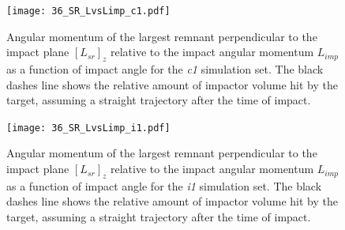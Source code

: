 {\begin{landscape}
\begin{figure}
\begin{center}
\texttt{[image: 36\_SR\_LvsLimp\_c1.pdf]}
\caption{Angular momentum of the largest remnant perpendicular to the impact plane $[L_{sr}]_z$ relative to the impact angular momentum $L_{imp}$ as a function of impact angle for the \emph{c1} simulation set. The black dashes line shows the relative amount of impactor volume hit by the target, assuming a straight trajectory after the time of impact.}
\label{ch03_fig36b}
\end{center}
\end{figure}

\begin{figure}
\begin{center}
\texttt{[image: 36\_SR\_LvsLimp\_i1.pdf]}
\caption{Angular momentum of the largest remnant perpendicular to the impact plane $[L_{sr}]_z$ relative to the impact angular momentum $L_{imp}$ as a function of impact angle for the \emph{i1} simulation set. The black dashes line shows the relative amount of impactor volume hit by the target, assuming a straight trajectory after the time of impact.}
\label{ch03_fig36c}
\end{center}
\end{figure}
\end{landscape}
}

